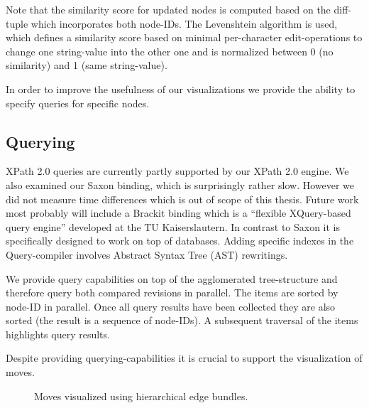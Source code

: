 Note that the similarity score for updated nodes is computed based on the diff-tuple which incorporates both node-IDs. The Levenshtein algorithm is used, which defines a similarity score based on minimal per-character edit-operations to change one string-value into the other one and is normalized between 0 (no similarity) and 1 (same string-value).

In order to improve the usefulness of our visualizations we provide the ability to specify queries for specific nodes.

\subsection{Querying}
XPath 2.0 queries are currently partly supported by our XPath 2.0 engine. We also examined our Saxon\cite{Saxon} binding, which is surprisingly rather slow. However we did not measure time differences which is out of scope of this thesis. Future work most probably will include a Brackit\cite{Brackit} binding which is a ``flexible XQuery-based query engine'' developed at the TU Kaiserslautern. In contrast to Saxon it is specifically designed to work on top of databases. Adding specific indexes in the Query-compiler involves Abstract Syntax Tree (AST) rewritings.

We provide query capabilities on top of the agglomerated tree-structure and therefore query both compared revisions in parallel. The items are sorted by node-ID in parallel. Once all query results have been collected they are also sorted (the result is a sequence of node-IDs). A subsequent traversal of the items highlights query results.

Despite providing querying-capabilities it is crucial to support the visualization of moves.

\begin{figure}[tb]
\caption{\label{fig:moves} Moves visualized using hierarchical edge bundles.}
\end{figure}

